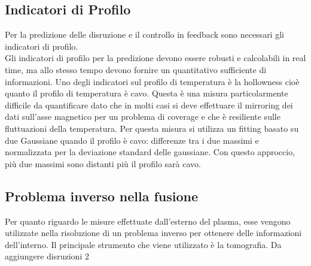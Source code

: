 \documentclass{article}
\begin{document}
\subsection{Indicatori di Profilo}
Per la predizione delle disruzione e il controllo in feedback sono necessari gli indicatori di profilo.\\ Gli indicatori di profilo per la predizione devono essere robusti e calcolabili in real time, ma allo stesso tempo devono fornire  un quantitativo sufficiente di informazioni. Uno degli indicatori sul profilo di temperatura è la hollowness cioè quanto il profilo di temperatura è cavo. Questa è una misura particolarmente difficile da quantificare dato che in molti casi si deve effettuare il mirroring dei dati sull'asse magnetico per un problema di coverage e che è resiliente sulle fluttuazioni della temperatura.\newline
Per questa misura si utilizza un fitting basato su due Gaussiane quando il profilo è cavo: differenze tra i due massimi e normalizzata per la deviazione standard delle  gaussiane. Con questo approccio, più due massimi sono distanti più il profilo sarà cavo.
\subsection{Problema inverso nella fusione}
Per quanto riguardo le misure effettuate dall'esterno del plasma, esse vengono utilizzate nella risoluzione di un problema inverso per ottenere delle informazioni dell'interno. Il principale strumento che viene utilizzato è la tomografia.
Da aggiungere disruzioni 2
\end{document}
